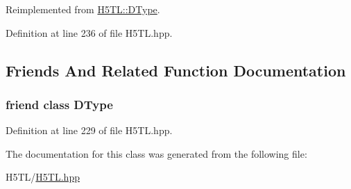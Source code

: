 Reimplemented from \hyperlink{class_h5_t_l_1_1_d_type_a0839ae0745f1ed4f15bfe521f14e983e}{H5\-T\-L\-::\-D\-Type}.



Definition at line 236 of file H5\-T\-L.\-hpp.



\subsection{Friends And Related Function Documentation}
\hypertarget{class_h5_t_l_1_1_p_d_type_a1a81627ad759d043623abd9311347fa4}{
\subsubsection[{D\-Type}]{\setlength{\rightskip}{0pt plus 5cm}friend class {\bf D\-Type}\hspace{0.3cm}{\ttfamily [friend]}}}\label{class_h5_t_l_1_1_p_d_type_a1a81627ad759d043623abd9311347fa4}


Definition at line 229 of file H5\-T\-L.\-hpp.



The documentation for this class was generated from the following file\-:\begin{DoxyCompactItemize}
\item 
H5\-T\-L/\hyperlink{_h5_t_l_8hpp}{H5\-T\-L.\-hpp}\end{DoxyCompactItemize}
